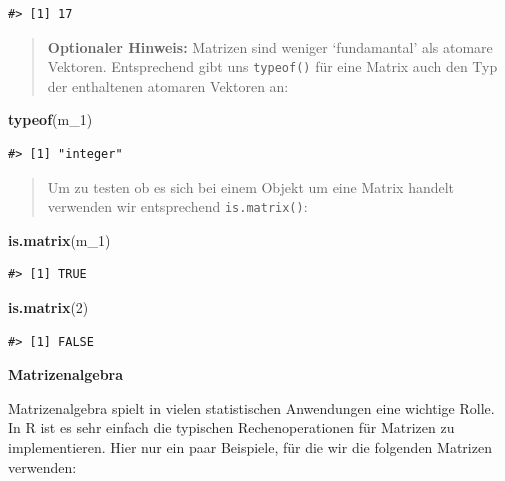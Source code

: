 \documentclass[]{tufte-book}
\newenvironment{Shaded}{}{}
\newcommand{\KeywordTok}[1]{\textcolor[rgb]{0.00,0.44,0.13}{\textbf{#1}}}
\newcommand{\DecValTok}[1]{\textcolor[rgb]{0.25,0.63,0.44}{#1}}
\newcommand{\NormalTok}[1]{#1}
\begin{document}
\begin{verbatim}
#> [1] 17
\end{verbatim}

\begin{quote}
\textbf{Optionaler Hinweis:} Matrizen sind weniger `fundamantal' als
atomare Vektoren. Entsprechend gibt uns \texttt{typeof()} für eine
Matrix auch den Typ der enthaltenen atomaren Vektoren an:
\end{quote}

\begin{Shaded}
\begin{Highlighting}[]
\KeywordTok{typeof}\NormalTok{(m_}\DecValTok{1}\NormalTok{)}
\end{Highlighting}
\end{Shaded}

\begin{verbatim}
#> [1] "integer"
\end{verbatim}

\begin{quote}
Um zu testen ob es sich bei einem Objekt um eine Matrix handelt
verwenden wir entsprechend \texttt{is.matrix()}:
\end{quote}

\begin{Shaded}
\begin{Highlighting}[]
\KeywordTok{is.matrix}\NormalTok{(m_}\DecValTok{1}\NormalTok{)}
\end{Highlighting}
\end{Shaded}

\begin{verbatim}
#> [1] TRUE
\end{verbatim}

\begin{Shaded}
\begin{Highlighting}[]
\KeywordTok{is.matrix}\NormalTok{(}\DecValTok{2}\NormalTok{)}
\end{Highlighting}
\end{Shaded}

\begin{verbatim}
#> [1] FALSE
\end{verbatim}

\textbf{Matrizenalgebra}

Matrizenalgebra spielt in vielen statistischen Anwendungen eine wichtige
Rolle. In R ist es sehr einfach die typischen Rechenoperationen für
Matrizen zu implementieren. Hier nur ein paar Beispiele, für die wir die
folgenden Matrizen verwenden:
\end{document}
